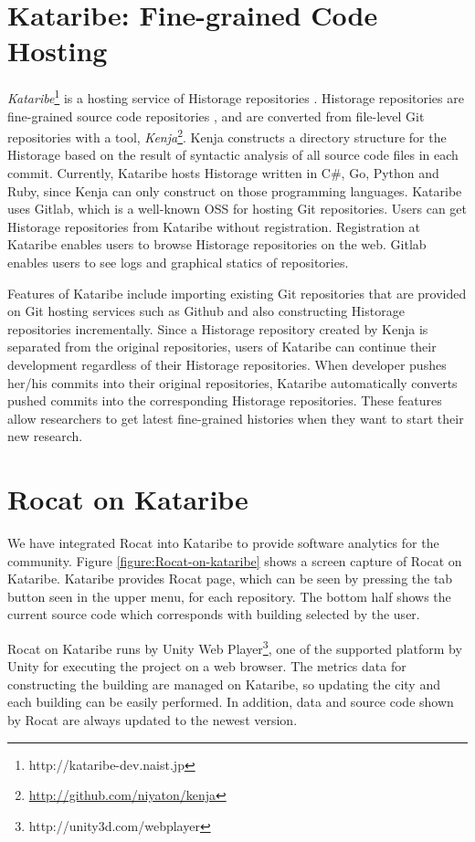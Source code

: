 \documentclass[conference]{IEEEtran}
\newcommand{\figref}[1]{Figure \ref{#1}}
\begin{document}
\section{Kataribe: Fine-grained Code Hosting}
\textit{Kataribe}\footnote{http://kataribe-dev.naist.jp} is a hosting service of Historage repositories \cite{Fujiwara:2014:KHS:2597073.2597125}.
Historage repositories are fine-grained source code repositories \cite{Hata:2011:HFV:2024445.2024463}, and are converted from file-level Git repositories with a tool, \textit{Kenja}\footnote{\url{http://github.com/niyaton/kenja}}.
Kenja constructs a directory structure for the Historage based on the result of syntactic analysis of all source code files in each commit.
Currently, Kataribe hosts Historage written in C\#, Go, Python and Ruby, since Kenja can only construct on those programming languages.
Kataribe uses Gitlab, which is a well-known OSS for hosting Git repositories.
Users can get Historage repositories from Kataribe without registration.
Registration at Kataribe enables users to browse Historage repositories on the web.
Gitlab enables users to see logs and graphical statics of repositories.

Features of Kataribe include importing existing Git repositories that are provided on Git hosting services such as Github and also constructing Historage repositories incrementally.
Since a Historage repository created by Kenja is separated from the original repositories, users of Kataribe can continue their development regardless of their Historage repositories.
When developer pushes her/his commits into their original repositories, Kataribe automatically converts pushed commits into the corresponding Historage repositories.
These features allow researchers to get latest fine-grained histories when they want to start their new research.

\section{Rocat on Kataribe}
We have integrated Rocat into Kataribe to provide software analytics for the community.
\figref{figure:Rocat-on-kataribe} shows a screen capture of Rocat on Kataribe.
Kataribe provides Rocat page, which can be seen by pressing the tab button seen in the upper menu, for each repository.
The bottom half shows the current source code which corresponds with building selected by the user.

Rocat on Kataribe runs by Unity Web Player\footnote{http://unity3d.com/webplayer}, one of the supported platform by Unity for executing the project on a web browser.
The metrics data for constructing the building are managed on Kataribe, so updating the city and each building can be easily performed.
In addition, data and source code shown by Rocat are always updated to the newest version.
\end{document}
